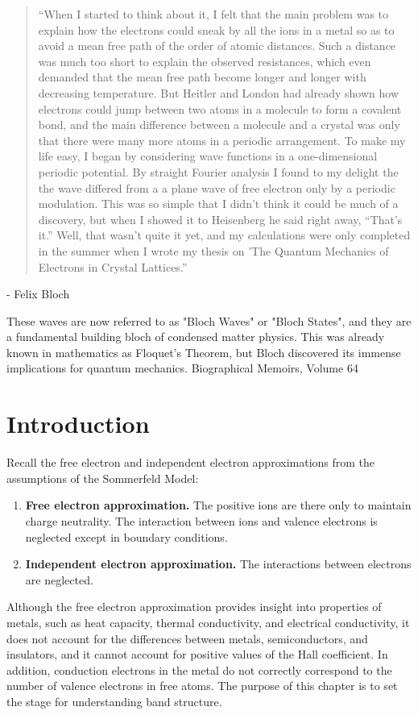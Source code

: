	\begin{quotation}
		``When I started to think about it, I felt that the main problem was to explain how the electrons could sneak by all the ions in a metal so as to avoid a mean free path of the order of atomic distances. Such a distance was much too short to explain the observed resistances, which even demanded that the mean free path become longer and longer with decreasing temperature. But Heitler and London had already shown how electrons could jump between two atoms in a molecule to form a covalent bond, and the main difference between a molecule and a crystal was only that there were many more atoms in a periodic arrangement. To make my life easy, I began by considering wave functions in a one-dimensional periodic potential. By straight Fourier analysis I found to my delight the the wave differed from a a plane wave of free electron only by a periodic modulation.
		This was so simple that I didn’t think it could be much of a discovery, but when I showed it to Heisenberg he said right away, “That’s it.” Well, that wasn’t quite it yet, and my calculations were only completed in the summer when I wrote my thesis on 'The Quantum Mechanics of Electrons in Crystal Lattices.''
	\end{quotation}
	- Felix Bloch


	These waves are now referred to as "Bloch Waves" or "Bloch States", and they are a fundamental building bloch of condensed matter physics. This was already known in mathematics as Floquet's Theorem, but Bloch discovered its immense implications for quantum mechanics.
	Biographical Memoirs, Volume 64 

\section{Introduction}
	Recall the free electron and independent electron approximations from the assumptions of the Sommerfeld Model:

	\begin{enumerate}
		\item \textbf{Free electron approximation.} The positive ions are there only to maintain charge neutrality. The interaction between ions and valence electrons is neglected except in boundary conditions.
		\item \textbf{Independent electron approximation.} The interactions between electrons are neglected.
	\end{enumerate}


	Although the free electron approximation provides insight into properties of metals, such as heat capacity, thermal conductivity, and electrical conductivity, it does not account for the differences between metals, semiconductors, and insulators, and it cannot account for positive values of the Hall coefficient. In addition, conduction electrons in the metal do not correctly correspond to the number of valence electrons in free atoms. The purpose of this chapter is to set the stage for understanding band structure.

